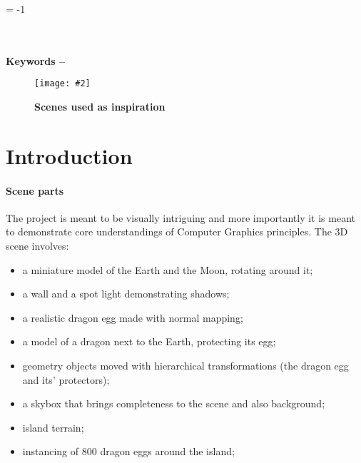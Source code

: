 \documentclass[10pt, a4paper]{article}
\title{\mytitle}
\author{\myauthor\hspace{1em}\\\contact\\Edinburgh Napier University\hspace{0.5em}-\hspace{0.5em}\mymodule}
\date{}
\newcommand{\figuremacro}[5]{
    \begin{figure}[#1]
        \centering
        \texttt{[image: \#2]}
        \caption[#3]{\textbf{#3}#4}
        \label{fig:#2}
    \end{figure}
}
\begin{document}
	
	
	\hyphenchar\font = -1
	
	\maketitle
	\begin{abstract}
		 The aim of this project is to create a realistic 3D scene, rendered in real-time. The project is inspired by the series \textit{Games of Thrones}\cite{dragons} (see \textbf{Figure {\ref{fig:inspiration}}}) and previous years projects found on the games website\cite{gamesWebsite} of Napier University. A wide variety of graphics techniques were used to create the 3D scene, from post-processing effects to shadowing, material shading, reflective and transparent water. This report covers how the scene was implemented and what future work is considered.
	\end{abstract}
	\\\\
	\textbf{Keywords -- }{\mykeywords}
	\figuremacro{h}{inspiration}{Scenes used as inspiration}{ }{1.0}	
    
	\section{Introduction}
    \paragraph{Scene parts} The project is meant to be visually intriguing and more importantly it is meant to demonstrate core understandings of Computer Graphics principles. The 3D scene involves:   
    \begin{itemize}
    	\item a miniature model of the Earth and the Moon, rotating around it;
    	\item a wall and a spot light demonstrating shadows;
    	\item a realistic dragon egg made with normal mapping;
    	\item a model of a dragon next to the Earth, protecting its egg;
    	\item geometry objects moved with hierarchical transformations (the dragon egg and its' protectors);
    	\item a skybox that brings completeness to the scene and also background;
    	\item island terrain;
    	\item instancing of 800 dragon eggs around the island;
    \end{itemize}
    
\end{document}
